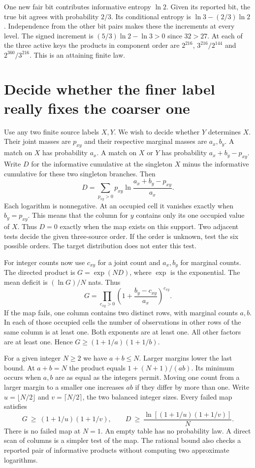 One new fair bit contributes informative entropy \(\ln 2\). Given its reported bit, the true bit agrees with probability \(2/3\). Its conditional entropy is \(\ln 3-(2/3)\ln 2\). Independence from the other bit pairs makes these the increments at every level. The signed increment is \((5/3)\ln 2-\ln 3>0\) since \(32>27\). At each of the three active keys the products in component order are \(2^{216}\), \(3^{216}/2^{144}\) and \(2^{360}/3^{216}\). This is an attaining finite law.

\clearpage

\section{Decide whether the finer label really fixes the coarser one}\label{decide-whether-the-finer-label-really-fixes-the-coarser-one}

Use any two finite source labels \(X,Y\). We wish to decide whether \(Y\) determines \(X\). Their joint masses are \(p_{xy}\) and their respective marginal masses are \(a_x,b_y\). A match on \(X\) has probability \(a_x\). A match on \(X\) or \(Y\) has probability \(a_x+b_y-p_{xy}\). Write \(D\) for the informative cumulative at the singleton \(X\) minus the informative cumulative for these two singleton branches. Then \[
D=\sum_{p_{xy}>0}p_{xy}\ln\frac{a_x+b_y-p_{xy}}{a_x}.
\] Each logarithm is nonnegative. At an occupied cell it vanishes exactly when \(b_y=p_{xy}\). This means that the column for \(y\) contains only its one occupied value of \(X\). Thus \(D=0\) exactly when the map exists on this support. Two adjacent tests decide the given three-source order. If the order is unknown, test the six possible orders. The target distribution does not enter this test.

For integer counts now use \(c_{xy}\) for a joint count and \(a_x,b_y\) for marginal counts. The directed product is \(G=\exp(ND)\), where \(\exp\) is the exponential. The mean deficit is \((\ln G)/N\) nats. Thus \[
G=\prod_{c_{xy}>0}\left(1+\frac{b_y-c_{xy}}{a_x}\right)^{c_{xy}}.
\] If the map fails, one column contains two distinct rows, with marginal counts \(a,b\). In each of those occupied cells the number of observations in other rows of the same column is at least one. Both exponents are at least one. All other factors are at least one. Hence \(G\ge(1+1/a)(1+1/b)\).

For a given integer \(N\ge2\) we have \(a+b\le N\). Larger margins lower the last bound. At \(a+b=N\) the product equals \(1+(N+1)/(ab)\). Its minimum occurs when \(a,b\) are as equal as the integers permit. Moving one count from a larger margin to a smaller one increases \(ab\) if they differ by more than one. Write \(u=\lfloor N/2\rfloor\) and \(v=\lceil N/2\rceil\), the two balanced integer sizes. Every failed map satisfies \[
G\ \ge\ (1+1/u)(1+1/v),\qquad
D\ \ge\ \frac{\ln[(1+1/u)(1+1/v)]}{N}.
\] There is no failed map at \(N=1\). An empty table has no probability law. A direct scan of columns is a simpler test of the map. The rational bound also checks a reported pair of informative products without computing two approximate logarithms.


